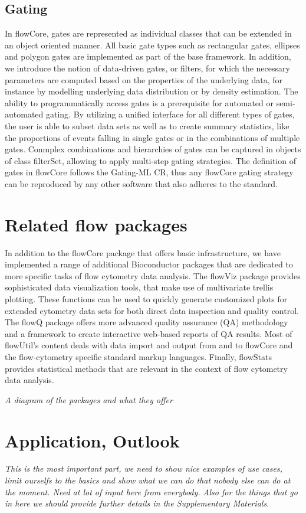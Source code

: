 \documentclass[12pt]{article}
\begin{document}
\subsection*{Gating}
In flowCore, gates are represented as individual classes that can be
extended in an object oriented manner. All basic gate types such as
rectangular gates, ellipses and polygon gates are implemented as part
of the base framework. In addition, we introduce the notion of
data-driven gates, or filters, for which the necessary parameters are
computed based on the properties of the underlying data, for instance
by modelling underlying data distribution or by density
estimation. The ability to programmatically access gates is a
prerequisite for automated or semi-automated gating. By utilizing a
unified interface for all different types of gates, the user is able
to subset data sets as well as to create summary statistics, like the
proportions of events falling in single gates or in the combinations
of multiple gates. Conmplex combinations and hierarchies of gates can
be captured in objects of class filterSet, allowing to apply
multi-step gating strategies. The definition of gates in flowCore
follows the Gating-ML CR, thus any flowCore gating strategy can be
reproduced by any other software that also adheres to the standard.

\section{Related flow packages}
In addition to the flowCore package that offers basic infrastructure,
we have implemented a range of additional Bioconductor packages that
are dedicated to more specific tasks of flow cytometry data
analysis. The flowViz package provides sophisticated data
visualization tools, that make use of multivariate trellis
plotting. These functions can be used to quickly generate customized
plots for extended cytometry data sets for both direct data inspection
and quality control. The flowQ package offers more advanced quality
assurance (QA) methodology and a framework to create interactive
web-based reports of QA results. Most of flowUtil's content deals with
data import and output from and to flowCore and the flow-cytometry
specific standard markup languages. Finally, flowStats provides
statistical methods that are relevant in the context of flow cytometry
data analysis.

\textit{A diagram of the packages and what they offer}

\section{Application, Outlook}
\textit{This is the most important part, we need to show nice examples
  of use cases, limit ourselfs to the basics and show what we can do
  that nobody else can do at the moment. Need at lot of input here
  from everybody. Also for the things that go in here we should
  provide further details in the Supplementary Materials.}
\end{document}
